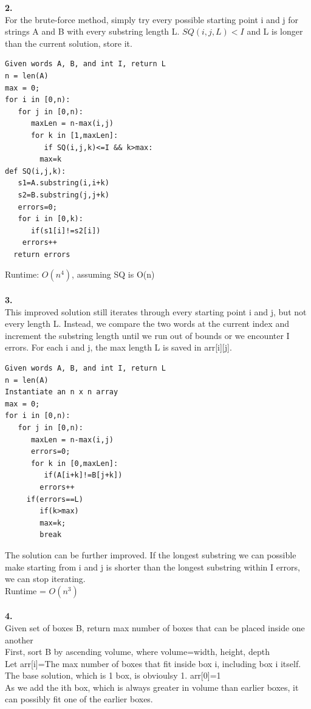 \documentclass[a4paper,12pt]{article}
\begin{document}
\noindent \textbf{2.} \\
For the brute-force method, simply try every possible starting point i and j for strings A and B with every substring length L. $SQ(i,j,L) < I$ and L is longer than the current solution, store it. \\
\begin{lstlisting}
Given words A, B, and int I, return L
n = len(A)
max = 0;
for i in [0,n):
   for j in [0,n):
      maxLen = n-max(i,j)
      for k in [1,maxLen]:
         if SQ(i,j,k)<=I && k>max:
	    max=k
def SQ(i,j,k):
   s1=A.substring(i,i+k)
   s2=B.substring(j,j+k)
   errors=0;
   for i in [0,k):
      if(s1[i]!=s2[i])
	errors++
  return errors
\end{lstlisting}
Runtime: $O(n^4)$, assuming SQ is O(n) \\\\
\noindent \textbf{3.} \\
This improved solution still iterates through every starting point i and j, but not every length L. Instead, we compare the two words at the current index and increment the substring length until we run out 
of bounds or we encounter I errors. For each i and j, the max length L is saved in arr[i][j].  
\begin{lstlisting}
Given words A, B, and int I, return L
n = len(A)
Instantiate an n x n array
max = 0;
for i in [0,n):
   for j in [0,n):
      maxLen = n-max(i,j)
      errors=0;
      for k in [0,maxLen]:
         if(A[i+k]!=B[j+k])
	    errors++
	 if(errors==L)
	    if(k>max)
		max=k;
	    break
\end{lstlisting}
The solution can be further improved. If the longest substring we can possible make starting from i and j is shorter than the longest substring within I errors, we can stop iterating. \\
Runtime = $O(n^3)$\\\\
\noindent \textbf{4.} \\
Given set of boxes B, return max number of boxes that can be placed inside one another\\
First, sort B by ascending volume, where volume=width, height, depth\\
Let arr[i]=The max number of boxes that fit inside box i, including box i itself. \\
The base solution, which is 1 box, is obvioulsy 1. arr[0]=1\\
As we add the ith box, which is always greater in volume than earlier boxes, it can possibly fit one of the earlier boxes.\\
\end{document}

